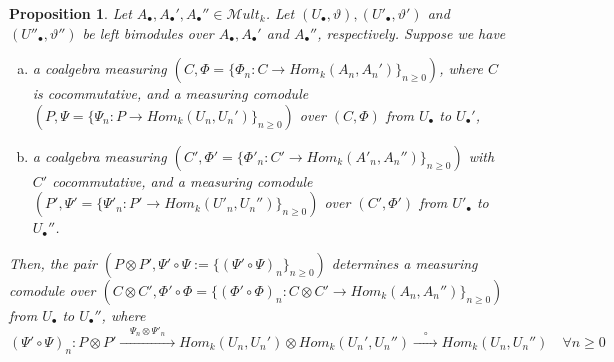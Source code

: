 \documentclass[10pt, colorlinks]{article}
\numberwithin{equation}{section} \DeclareMathSizes{2}{10}{12}{13}
\newtheorem{thm}{Proposition}[section]
\begin{document}
\smallskip



 \begin{thm}\label{prop5.11}
     Let $A_\bullet,A_\bullet',A_\bullet''\in \mathscr Mult_k$. Let $(U_\bullet,\vartheta),(U'_\bullet,\vartheta')$ and $(U''_\bullet,\vartheta'')$ be left bimodules over $A_\bullet,A_\bullet'$ and $A_\bullet''$, respectively. Suppose we have
     \begin{enumerate}[(a)]
         \item a coalgebra measuring $(C,\Phi=\{\Phi_n:C\longrightarrow Hom_k(A_n,A_n')\}_{n\geq 0})$, where $C$ is cocommutative, and a measuring comodule $(P,\Psi=\{\Psi_n:P\longrightarrow Hom_k(U_n,U_n')\}_{n\geq 0})$ over $(C,\Phi)$ from $U_\bullet$ to $U_\bullet'$,
         \item a coalgebra measuring $(C',\Phi'=\{\Phi'_n:C'\longrightarrow Hom_k(A'_n,A_n'')\}_{n\geq 0})$ with $C'$ cocommutative, and a measuring comodule $(P',\Psi'=\{\Psi'_n:P'\longrightarrow Hom_k(U'_n,U_n'')\}_{n\geq 0})$ over $(C',\Phi')$ from $U'_\bullet$ to $U_\bullet''$.
     \end{enumerate}
     Then, the pair $(P\otimes P',\Psi'\circ \Psi:=\{(\Psi'\circ \Psi)_n\}_{n\geq 0})$ determines a measuring comodule over $(C\otimes C',\Phi'\circ \Phi=\{(\Phi'\circ\Phi)_n:C\otimes C'\longrightarrow Hom_k(A_n,A_n'')\}_{n\geq 0})$ from $U_\bullet$ to $U_\bullet''$, where
     \begin{equation}\label{eq5.18}
         (\Psi'\circ \Psi)_n: P\otimes P'\xrightarrow[]{\quad\Psi_n\otimes \Psi'_n\quad}Hom_k(U_n,U_n')\otimes Hom_k(U_n',U_n'')\xrightarrow[]{\quad\circ\quad}Hom_k(U_n,U_n'')\quad\forall n\geq 0
     \end{equation}
 \end{thm}
 
\end{document}

